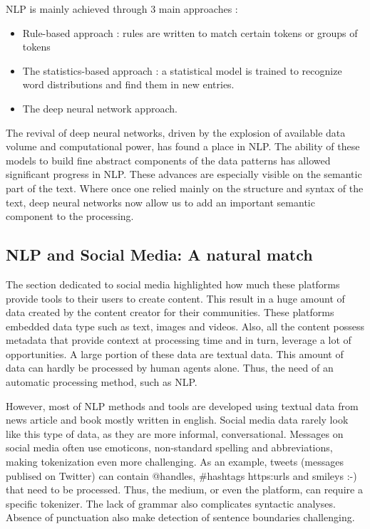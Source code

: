 NLP is mainly achieved through 3 main approaches \cite{hirschbergAdvancesNaturalLanguage2015}:

\begin{itemize}
    \item Rule-based approach : rules are written to match certain tokens or groups of tokens
    \item The statistics-based approach : a statistical model is trained to recognize word distributions and find them in new entries.
    \item The deep neural network approach.
\end{itemize}

The revival of deep neural networks, driven by the explosion of available data volume and computational power, has found a place in NLP.
The ability of these models to build fine abstract components of the data patterns has allowed significant progress in NLP.
These advances are especially visible on the semantic part of the text.
Where once one relied mainly on the structure and syntax of the text, deep neural networks now allow us to add an important semantic component to the processing.

\subsection{NLP and Social Media: A natural match}
The section dedicated to social media highlighted how much these platforms provide tools to their users to create content.
This result in a huge amount of data created by the content creator for their communities.  %
These platforms embedded data type such as text, images and videos.
Also, all the content possess metadata that provide context at processing time and in turn, leverage a lot of opportunities.
A large portion of these data are textual data.
This amount of data can hardly be processed by human agents alone.
Thus, the need of an automatic processing method, such as NLP.

However, most of NLP methods and tools are developed using textual data from news article and book mostly written in english.
Social media data rarely look like this type of data, as they are more informal, conversational.
Messages on social media often use emoticons, non-standard spelling and abbreviations, making tokenization even more challenging.
As an example, tweets (messages publised on Twitter) can contain @handles, \#hashtags https:\/\/urls and smileys :-) that need to be processed.
Thus, the medium, or even the platform, can require a specific tokenizer.
The lack of grammar also complicates syntactic analyses.
Absence of punctuation also make detection of sentence boundaries challenging.

